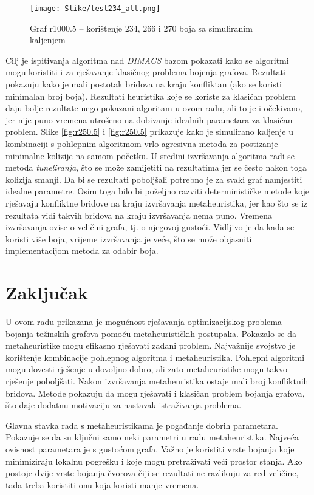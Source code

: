 \documentclass[times, utf8, diplomski, numeric]{fer}
\begin{document}
\begin{figure}[htb]
	\texttt{[image: Slike/test234\_all.png]}
	\caption{Graf r1000.5 -- korištenje $234$, $266$ i $270$ boja sa simuliranim kaljenjem}
	\label{fig:r1000.5}
\end{figure}

Cilj je ispitivanja algoritma nad \emph{DIMACS} bazom pokazati kako se algoritmi mogu koristiti i za rješavanje klasičnog problema bojenja grafova. Rezultati pokazuju kako je mali postotak bridova na kraju konfliktan (ako se koristi minimalan broj boja). Rezultati heuristika koje se koriste za klasičan problem daju bolje rezultate nego pokazani algoritam u ovom radu, ali to je i očekivano, jer nije puno vremena utrošeno na dobivanje idealnih parametara za klasičan problem. Slike \ref{fig:r250.5} i \ref{fig:r250.5} prikazuje kako je simulirano kaljenje u kombinaciji s pohlepnim algoritmom vrlo agresivna metoda za postizanje minimalne kolizije na samom početku. U sredini izvršavanja algoritma radi se metoda \emph{tuneliranja}, što se može zamijetiti na rezultatima jer se često nakon toga kolizija smanji. Da bi se rezultati poboljšali potrebno je za svaki graf namjestiti idealne parametre. Osim toga bilo bi poželjno razviti determinističke metode koje rješavaju konfliktne bridove na kraju izvršavanja metaheuristika, jer kao što se iz rezultata vidi takvih bridova na kraju izvršavanja nema puno. Vremena izvršavanja ovise o veličini grafa, tj. o njegovoj gustoći. Vidljivo je da kada se koristi više boja, vrijeme izvršavanja je veće, što se može objasniti implementacijom metoda za odabir boja.


\chapter{Zaključak}

U ovom radu prikazana je mogućnost rješavanja optimizacijskog problema bojanja težinskih grafova pomoću metaheurističkih postupaka. Pokazalo se da metaheuristike mogu efikasno rješavati zadani problem. Najvažnije svojstvo je korištenje kombinacije pohlepnog algoritma i metaheuristika. Pohlepni algoritmi mogu dovesti rješenje u dovoljno dobro, ali zato metaheuristike mogu takvo rješenje poboljšati. Nakon izvršavanja metaheuristika ostaje mali broj konfliktnih bridova. Metode pokazuju da mogu rješavati i klasičan problem bojanja grafova, što daje dodatnu motivaciju za nastavak istraživanja problema.

Glavna stavka rada s metaheuristikama je pogađanje dobrih parametara. Pokazuje se da su ključni samo neki parametri u radu metaheuristika. Najveća ovisnost parametara je s gustoćom grafa. Važno je koristiti vrste bojanja koje minimiziraju lokalnu pogrešku i koje mogu pretraživati veći prostor stanja. Ako postoje dvije vrste bojanja čvorova čiji se rezultati ne razlikuju za red veličine, tada treba koristiti onu koja koristi manje vremena.
\end{document}
